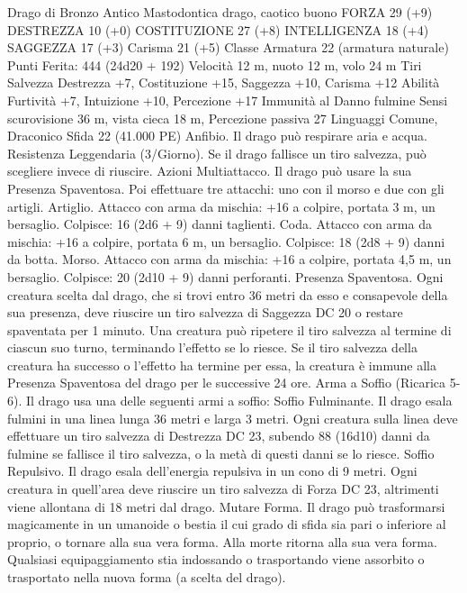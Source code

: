 \begin{multicols}{2}
Drago di Bronzo Antico
Mastodontica drago, caotico buono
FORZA 29 (+9)
DESTREZZA 10 (+0)
COSTITUZIONE 27 (+8)
INTELLIGENZA 18 (+4)
SAGGEZZA 17 (+3)
Carisma 21 (+5)
Classe Armatura 22 (armatura naturale)
\hspace*{0pt}\hfill{Punti Ferita}: 444 (24d20 + 192)
Velocità 12 m, nuoto 12 m, volo 24 m
Tiri Salvezza Destrezza +7, Costituzione +15, Saggezza +10,
Carisma +12
Abilità Furtività +7, Intuizione +10, Percezione +17
Immunità al Danno fulmine
Sensi scurovisione 36 m, vista cieca 18 m, Percezione passiva 27
Linguaggi Comune, Draconico
Sfida 22 (41.000 PE)
Anfibio. Il drago può respirare aria e acqua.
Resistenza Leggendaria (3/Giorno). Se il drago fallisce un tiro
salvezza, può scegliere invece di riuscire.
Azioni
Multiattacco. Il drago può usare la sua Presenza Spaventosa. Poi
effettuare tre attacchi: uno con il morso e due con gli artigli.
Artiglio. Attacco con arma da mischia: +16 a colpire, portata 3
m, un bersaglio.
Colpisce: 16 (2d6 + 9) danni taglienti.
Coda. Attacco con arma da mischia: +16 a colpire, portata 6 m,
un bersaglio.
Colpisce: 18 (2d8 + 9) danni da botta.
Morso. Attacco con arma da mischia: +16 a colpire, portata 4,5
m, un bersaglio.
Colpisce: 20 (2d10 + 9) danni perforanti.
Presenza Spaventosa. Ogni creatura scelta dal drago, che si trovi
entro 36 metri da esso e consapevole della sua presenza, deve
riuscire un tiro salvezza di Saggezza DC 20 o restare spaventata per
1 minuto. Una creatura può ripetere il tiro salvezza al termine di
ciascun suo turno, terminando l’effetto se lo riesce. Se il tiro salvezza
della creatura ha successo o l’effetto ha termine per essa, la creatura è
immune alla Presenza Spaventosa del drago per le successive 24 ore.
Arma a Soffio (Ricarica 5-6). Il drago usa una delle seguenti armi
a soffio:
Soffio Fulminante. Il drago esala fulmini in una linea lunga 36 metri
e larga 3 metri. Ogni creatura sulla linea deve effettuare un tiro
salvezza di Destrezza DC 23, subendo 88 (16d10) danni da fulmine
se fallisce il tiro salvezza, o la metà di questi danni se lo riesce.
Soffio Repulsivo. Il drago esala dell’energia repulsiva in un cono di 9
metri. Ogni creatura in quell’area deve riuscire un tiro salvezza di
Forza DC 23, altrimenti viene allontana di 18 metri dal drago.
Mutare Forma. Il drago può trasformarsi magicamente in un
umanoide o bestia il cui grado di sfida sia pari o inferiore al proprio,
o tornare alla sua vera forma. Alla morte ritorna alla sua vera forma.
Qualsiasi equipaggiamento stia indossando o trasportando viene
assorbito o trasportato nella nuova forma (a scelta del drago).

\end{multicols}
